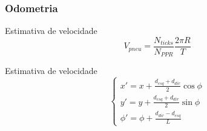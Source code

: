 \begin{frame}
	\frametitle{Odometria}
	\vspace{1.0cm}
	
	
	\begin{block}{Estimativa de velocidade}
		\begin{equation}
			V_{pneu} = \frac{N_{ticks}}{N_{PPR}} \frac{2\pi R}{T}
		\end{equation}
	\end{block}
	
	\vspace{-2.0cm}
	\begin{exampleblock}{Estimativa de velocidade}
		\begin{equation}
			\left \{ \begin{matrix} x' = x + \frac{d_{esq} + d_{dir}}{2} \cos{\phi}
			\\
			y' = y + \frac{d_{esq} + d_{dir}}{2} \sin{\phi}
			\\
			\phi' = \phi + \frac{d_{dir} - d_{esq}}{L} \end{matrix} \right.
		\end{equation}
	\end{exampleblock}
\end{frame}
